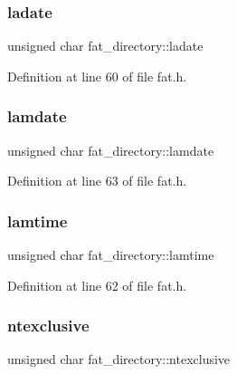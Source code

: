 \subsubsection{\texorpdfstring{ladate}{ladate}}
{\footnotesize\ttfamily unsigned char fat\+\_\+directory\+::ladate}



Definition at line 60 of file fat.\+h.

\mbox{\label{a00061_a9aef03a8fc10dd13abe417d792313fc1_a9aef03a8fc10dd13abe417d792313fc1}} 
\subsubsection{\texorpdfstring{lamdate}{lamdate}}
{\footnotesize\ttfamily unsigned char fat\+\_\+directory\+::lamdate}



Definition at line 63 of file fat.\+h.

\mbox{\label{a00061_aa010db7b1599af6f1e7ee527219c9f8d_aa010db7b1599af6f1e7ee527219c9f8d}} 
\subsubsection{\texorpdfstring{lamtime}{lamtime}}
{\footnotesize\ttfamily unsigned char fat\+\_\+directory\+::lamtime}



Definition at line 62 of file fat.\+h.

\mbox{\label{a00061_ad259390d9a31a807cdff543b5b10d9f5_ad259390d9a31a807cdff543b5b10d9f5}} 
\subsubsection{\texorpdfstring{ntexclusive}{ntexclusive}}
{\footnotesize\ttfamily unsigned char fat\+\_\+directory\+::ntexclusive}



